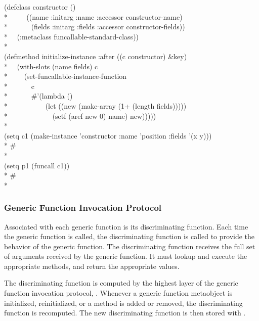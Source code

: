 \begin{lisp}
(defclass constructor ()\\*
~~~~ ((name :initarg :name :accessor constructor-name)\\*
~~~~~~(fields :initarg :fields :accessor constructor-fields))\\*
~~(:metaclass funcallable-standard-class))\\*
\\
(defmethod initialize-instance :after ((c constructor) \&key)\\*
~~(with-slots (name fields) c \\*
~~~~(set-funcallable-instance-function \\*
~~~~~~c \\*
~~~~~~\#'(lambda ()\\*
~~~~~~~~~~(let ((new (make-array (1+ (length fields)))))\\*
~~~~~~~~~~~~(setf (aref new 0) name) new)))))\\*
\\
(setq c1 (make-instance 'constructor :name 'position :fields '(x y)))\\*
\#<CONSTRUCTOR 262437>\\*
\\
(setq p1 (funcall c1))\\*
\#<ARRAY 3 263674>\\*
\end{lisp}

\subsubsection{Generic Function Invocation Protocol}

Associated with each generic function is its discriminating function. Each time
the generic function is called, the discriminating function is called to provide
the behavior of the generic function. The discriminating function receives the
full set of arguments received by the generic function. It must lookup and
execute the appropriate methods, and return the appropriate values. 

The discriminating function is computed by the highest layer of the generic
function invocation protocol, . Whenever a
generic function metaobject is initialized, reinitialized, or a method is added
or removed, the discriminating function is recomputed. The new discriminating
function is then stored with . 

